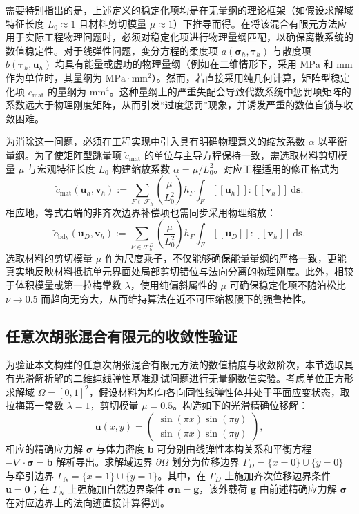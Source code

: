 需要特别指出的是，上述定义的稳定化项均是在无量纲的理论框架（如假设求解域特征长度 $L_0 \approx 1$ 且材料剪切模量 $\mu \approx 1$）下推导而得。在将该混合有限元方法应用于实际工程物理问题时，必须对稳定化项进行物理量纲匹配，以确保离散系统的数值稳定性。对于线弹性问题，变分方程的柔度项 $a(\boldsymbol{\sigma}_h, \boldsymbol{\tau}_h)$ 与散度项 $b(\boldsymbol{\tau}_h, \boldsymbol{u}_h)$ 均具有能量或虚功的物理量纲（例如在二维情形下，采用 $\mathrm{MPa}$ 和 $\mathrm{mm}$ 作为单位时，其量纲为 $\mathrm{MPa} \cdot \mathrm{mm}^2$）。然而，若直接采用纯几何计算，矩阵型稳定化项 $c_{\mathrm{mat}}$ 的量纲为 $\mathrm{mm}^4$。这种量纲上的严重失配会导致代数系统中惩罚项矩阵的系数远大于物理刚度矩阵，从而引发“过度惩罚”现象，并诱发严重的数值自锁与收敛困难。

为消除这一问题，必须在工程实现中引入具有明确物理意义的缩放系数 $\alpha$ 以平衡量纲。为了使矩阵型跳量项 $\tilde{c}_{\text{mat}}$ 的单位与主导方程保持一致，需选取材料剪切模量 $\mu$ 与宏观特征长度 $L_0$ 构建缩放系数 $\alpha = \mu / L_0^2$。对应工程适用的修正格式为
\[
\tilde{c}_{\text{mat}}(\boldsymbol{u}_h, \boldsymbol{v}_h) := \sum_{F \in \mathcal{F}_h} \left( \frac{\mu}{L_0^2} \right) h_F \int_{F} [\![ \boldsymbol{u}_h ]\!] : [\![ \boldsymbol{v}_h ]\!] ~\mathrm{d}\boldsymbol{s}.
\]
相应地，等式右端的非齐次边界补偿项也需同步采用物理缩放：
\[
\tilde{c}_{\text{bdy}}(\boldsymbol{u}_D, \boldsymbol{v}_h) := \sum_{F \in \mathcal{F}_h^D} \left( \frac{\mu}{L_0^2} \right) h_F \int_{F} [\![ \boldsymbol{u}_D ]\!] : [\![ \boldsymbol{v}_h ]\!] ~\mathrm{d}\boldsymbol{s}.
\]
选取材料的剪切模量 $\mu$ 作为尺度乘子，不仅能够确保能量量纲的严格一致，更能真实地反映材料抵抗单元界面处局部剪切错位与法向分离的物理刚度。此外，相较于体积模量或第一拉梅常数 $\lambda$，使用纯偏斜属性的 $\mu$ 可确保稳定化项不随泊松比 $\nu \to 0.5$ 而趋向无穷大，从而维持算法在近不可压缩极限下的强鲁棒性。


\subsection{任意次胡张混合有限元的收敛性验证}
\label{subsec:hz_fe_verification}

为验证本文构建的任意次胡张混合有限元方法的数值精度与收敛阶次，本节选取具有光滑解析解的二维纯线弹性基准测试问题进行无量纲数值实验。考虑单位正方形求解域 $\Omega = [0, 1]^2$，假设材料为均匀各向同性线弹性体并处于平面应变状态，取拉梅第一常数 $\lambda = 1$，剪切模量 $\mu = 0.5$。构造如下的光滑精确位移解：
\[
\boldsymbol{u}(x,y) = \begin{pmatrix} \sin(\pi x) \sin(\pi y) \\ \sin(\pi x) \sin(\pi y) \end{pmatrix},
\]
相应的精确应力解 $\boldsymbol{\sigma}$ 与体力密度 $\boldsymbol{b}$ 可分别由线弹性本构关系和平衡方程 $-\nabla \cdot \boldsymbol{\sigma} = \boldsymbol{b}$ 解析导出。求解域边界 $\partial\Omega$ 划分为位移边界 $\Gamma_D = \{x = 0\} \cup \{y = 0\}$ 与牵引边界 $\Gamma_N = \{x = 1\} \cup \{y = 1\}$。其中，在 $\Gamma_D$ 上施加齐次位移边界条件 $\boldsymbol{u} = \boldsymbol{0}$；在 $\Gamma_N$ 上强施加自然边界条件 $\boldsymbol{\sigma}\boldsymbol{n} = \boldsymbol{g}$，该外载荷 $\boldsymbol{g}$ 由前述精确应力解 $\boldsymbol{\sigma}$ 在对应边界上的法向迹直接计算得到。

